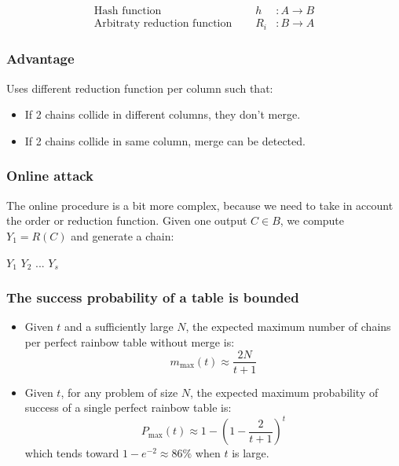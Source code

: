 \begin{eqnarray*}
    \textrm{Hash function } \quad & h &: A \to B \\
    \textrm{Arbitraty reduction function } \quad & R_i &: B \to A 
\end{eqnarray*}

\subsubsection{Advantage}
Uses different reduction function per column such that:
\begin{itemize}
    \item If 2 chains collide in different columns, they don't merge.
    \item If 2 chains collide in same column, merge can be detected.
\end{itemize}

\subsubsection{Online attack}
The online procedure is a bit more complex, because we need to take in
account the order or reduction function.
Given one output $C \in B$, we compute $Y_1 = R(C)$ and generate a
chain: 
\begin{center}
    $Y_1$  $Y_2$  ...  $Y_s $
\end{center}


\subsubsection{The success probability of a table is bounded}
\begin{itemize}
    \item
        Given $t$ and a sufficiently large $N$, the expected maximum number of
        chains per perfect rainbow table without merge is:
        $$ m_{\max}(t)\approx\frac{2N}{t+1} $$
    \item
        Given $t$, for any problem of size $N$, the expected maximum probability of
        success of a single perfect rainbow table is:
        $$ P_{\max}(t)\approx 1 - (1-\frac{2}{t+1})^t $$
        which tends toward $ 1 - e^{-2}\approx 86\% $ when $t$ is large.

\end{itemize}

